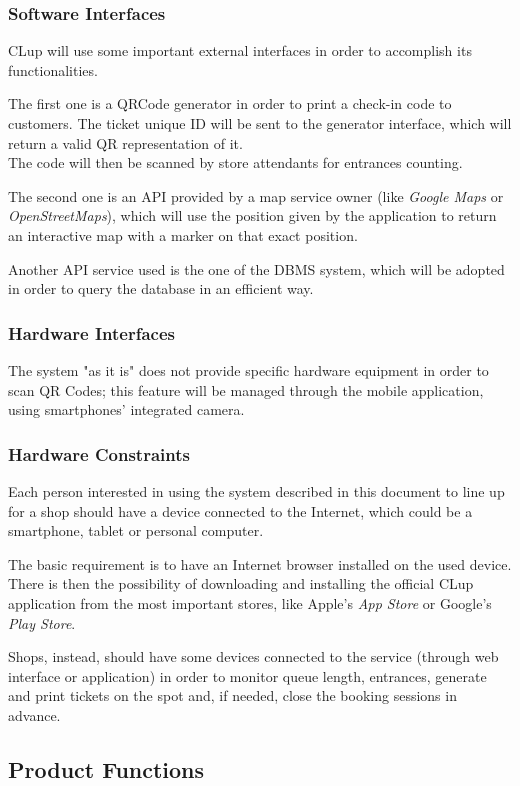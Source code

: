 \documentclass[table, 12pt]{article}
\begin{document}
\subsubsection{Software Interfaces}
CLup will use some important external interfaces in order to accomplish its functionalities.

The first one is a QRCode generator in order to print a check-in code to customers.
The ticket unique ID will be sent to the generator interface, which will return a valid QR representation of it.\\
The code will then be scanned by store attendants for entrances counting.

The second one is an API provided by a map service owner (like \textit{Google Maps} or \textit{OpenStreetMaps}), which will use the position given by the application to return an interactive map with a marker on that exact position.

Another API service used is the one of the DBMS system, which will be adopted in order to query the database in an efficient way.
\subsubsection{Hardware Interfaces}
The system "as it is" does not provide specific hardware equipment in order to scan QR Codes; this feature will be managed through the mobile application, using smartphones' integrated camera.
\subsubsection{Hardware Constraints}
Each person interested in using the system described in this document to line up for a shop should have a device connected to the Internet, which could be a smartphone, tablet or personal computer.

The basic requirement is to have an Internet browser installed on the used device.
There is then the possibility of downloading and installing the official CLup application from the most important stores, like Apple's \textit{App Store} or Google's \textit{Play Store}.

Shops, instead, should have some devices connected to the service (through web interface or application) in order to monitor queue length, entrances, generate and print tickets on the spot and, if needed, close the booking sessions in advance.

\subsection{Product Functions}
\label{product_functions}
\end{document}
